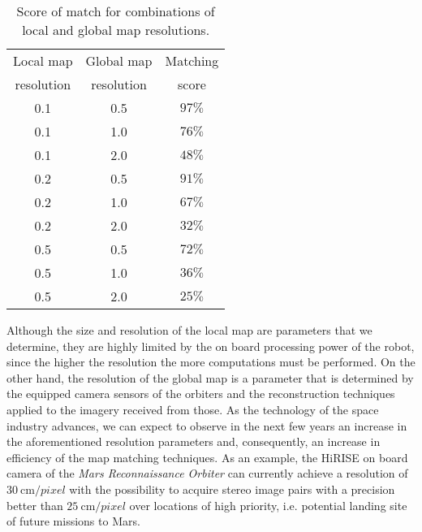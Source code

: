 \begin{table}[h!]
    \centering
    \begin{tabular}{| c | c || c |}
        \hline
        Local map & Global map & Matching \\
        resolution & resolution & score \\
        \hline
        \hline
        0.1 & 0.5 & $97\%$ \\
        \hline
        0.1 & 1.0 & $76\%$ \\
        \hline
        0.1 & 2.0 & $48\%$ \\
        \hline
        \hline
        0.2 & 0.5 & $91\%$ \\
        \hline
        0.2 & 1.0 & $67\%$ \\
        \hline
        0.2 & 2.0 & $32\%$ \\
        \hline
        \hline
        0.5 & 0.5 & $72\%$ \\
        \hline
        0.5 & 1.0 & $36\%$ \\
        \hline
        0.5 & 2.0 & $25\%$ \\
        \hline
    \end{tabular}
    \caption[Local and global map resolution viability]{
        Score of match for combinations of local and global map resolutions.
    }
    \label{table:map_resolutions}
\end{table}

Although the size and resolution of the local map are parameters that we
determine, they are highly limited by the on board processing power of the
robot, since the higher the resolution the more computations must be performed.
On the other hand, the resolution of the global map is a parameter that is
determined by the equipped camera sensors of the orbiters and the
reconstruction techniques applied to the imagery received from those.
As the technology of the space industry advances, we can expect to observe
in the next few years an increase in the aforementioned resolution parameters
and, consequently, an increase in efficiency of the map matching techniques.
As an example, the HiRISE on board camera of the
\textit{Mars Reconnaissance Orbiter} can currently achieve a resolution of
$\SI{30}{\cm \per pixel}$ with the possibility to acquire stereo image pairs
with a precision better than $\SI{25}{\cm \per pixel}$ over locations of
high priority, i.e. potential landing site of future missions to Mars.

